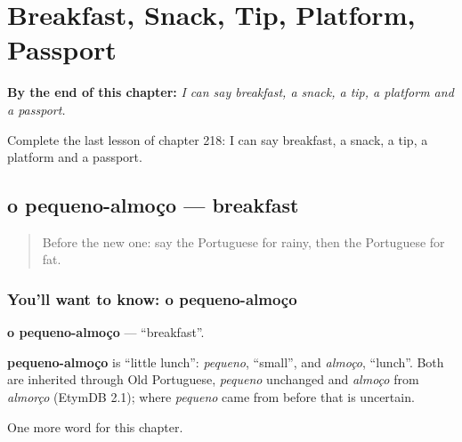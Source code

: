 
\chapter{Breakfast, Snack, Tip, Platform, Passport}
\label{ch:pt-breakfast-snack-tip-platform-passport}

\begin{chapteropening}
\textbf{By the end of this chapter:} \emph{I can say breakfast, a snack, a tip, a platform and a passport.}

Complete the last lesson of chapter 218: I can say breakfast, a snack, a tip, a platform and a passport.
\end{chapteropening}

\section[o pequeno-almoço]{o pequeno-almoço — breakfast}

\label{lesson:PT-C218-pequeno-almoco}



\begin{quote}
Before the new one: say the Portuguese for rainy, then the Portuguese for fat.
\end{quote}

\subsection*{You'll want to know: o pequeno-almoço}
\textbf{o pequeno-almoço} — \textquotedblleft{}breakfast\textquotedblright{}.

\begin{cousinweb}
\textbf{pequeno-almoço} is \textquotedblleft{}little lunch\textquotedblright{}: \emph{pequeno}, \textquotedblleft{}small\textquotedblright{}, and \emph{almoço}, \textquotedblleft{}lunch\textquotedblright{}. Both are inherited through Old Portuguese, \emph{pequeno} unchanged and \emph{almoço} from \emph{almorço} (EtymDB 2.1); where \emph{pequeno} came from before that is uncertain.
\end{cousinweb}

\begin{grammarlens}[title={What you've built}]
One more word for this chapter.
\end{grammarlens}

